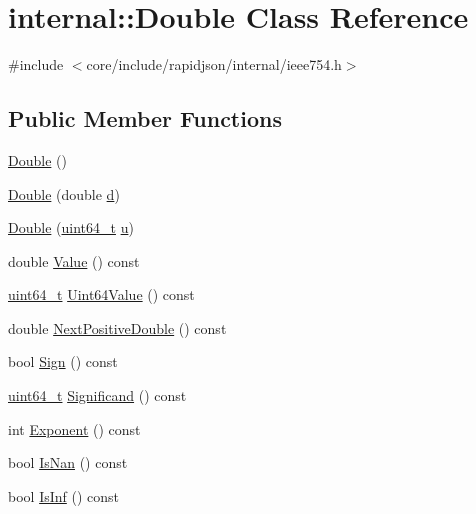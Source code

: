 \hypertarget{classinternal_1_1Double}{}\section{internal\+:\+:Double Class Reference}
\label{classinternal_1_1Double}


{\ttfamily \#include $<$core/include/rapidjson/internal/ieee754.\+h$>$}

\subsection*{Public Member Functions}
\begin{DoxyCompactItemize}
\item 
\hyperlink{classinternal_1_1Double_a98e2cff9880cd032d174e9721ae40ddd}{Double} ()
\item 
\hyperlink{classinternal_1_1Double_ad66f3b914570ce62e9f16083117f3e4f}{Double} (double \hyperlink{classinternal_1_1Double_ad0c9466272cf4cbf102b085bba491727}{d})
\item 
\hyperlink{classinternal_1_1Double_a293a7ca841d847ea3e83ffa28b68601f}{Double} (\hyperlink{stdint_8h_aec6fcb673ff035718c238c8c9d544c47}{uint64\+\_\+t} \hyperlink{classinternal_1_1Double_a1b9cc1e3f33520b6131a5aadd27f6e52}{u})
\item 
double \hyperlink{classinternal_1_1Double_af35ab8a9e1ee41b1fd8a97d5899cfa1d}{Value} () const 
\item 
\hyperlink{stdint_8h_aec6fcb673ff035718c238c8c9d544c47}{uint64\+\_\+t} \hyperlink{classinternal_1_1Double_a9b9f08386be36634cc79f2e9427517f9}{Uint64\+Value} () const 
\item 
double \hyperlink{classinternal_1_1Double_a3da449454b6b7e7108ed1b9a00625b68}{Next\+Positive\+Double} () const 
\item 
bool \hyperlink{classinternal_1_1Double_ad3f4421a50d77c3af20638a12ec8f168}{Sign} () const 
\item 
\hyperlink{stdint_8h_aec6fcb673ff035718c238c8c9d544c47}{uint64\+\_\+t} \hyperlink{classinternal_1_1Double_a8c3f5cf8152af8588d32530238c35aad}{Significand} () const 
\item 
int \hyperlink{classinternal_1_1Double_a39aa84d5dc24cf22ca44578fab515f44}{Exponent} () const 
\item 
bool \hyperlink{classinternal_1_1Double_a5c1ad93b8c866afdd5c2b412ef7bea98}{Is\+Nan} () const 
\item 
bool \hyperlink{classinternal_1_1Double_a2efab47ffbfa75e0fca1129263b86545}{Is\+Inf} () const 

\end{DoxyCompactItemize}
